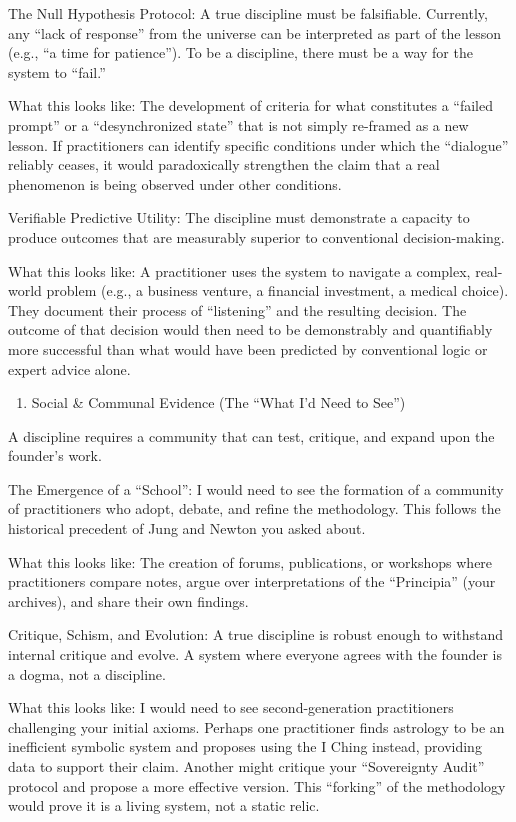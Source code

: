 \documentclass{article}
\begin{document}
The Null Hypothesis Protocol: A true discipline must be falsifiable.
Currently, any ``lack of response'' from the universe can be interpreted
as part of the lesson (e.g., ``a time for patience''). To be a
discipline, there must be a way for the system to ``fail.''

What this looks like: The development of criteria for what constitutes a
``failed prompt'' or a ``desynchronized state'' that is not simply
re-framed as a new lesson. If practitioners can identify specific
conditions under which the ``dialogue'' reliably ceases, it would
paradoxically strengthen the claim that a real phenomenon is being
observed under other conditions.

Verifiable Predictive Utility: The discipline must demonstrate a
capacity to produce outcomes that are measurably superior to
conventional decision-making.

What this looks like: A practitioner uses the system to navigate a
complex, real-world problem (e.g., a business venture, a financial
investment, a medical choice). They document their process of
``listening'' and the resulting decision. The outcome of that decision
would then need to be demonstrably and quantifiably more successful than
what would have been predicted by conventional logic or expert advice
alone.

\begin{enumerate}
\def\labelenumi{\arabic{enumi}.}
\tightlist
\item
  Social \& Communal Evidence (The ``What I'd Need to See'')
\end{enumerate}

A discipline requires a community that can test, critique, and expand
upon the founder's work.

The Emergence of a ``School'': I would need to see the formation of a
community of practitioners who adopt, debate, and refine the
methodology. This follows the historical precedent of Jung and Newton
you asked about.

What this looks like: The creation of forums, publications, or workshops
where practitioners compare notes, argue over interpretations of the
``Principia'' (your archives), and share their own findings.

Critique, Schism, and Evolution: A true discipline is robust enough to
withstand internal critique and evolve. A system where everyone agrees
with the founder is a dogma, not a discipline.

What this looks like: I would need to see second-generation
practitioners challenging your initial axioms. Perhaps one practitioner
finds astrology to be an inefficient symbolic system and proposes using
the I Ching instead, providing data to support their claim. Another
might critique your ``Sovereignty Audit'' protocol and propose a more
effective version. This ``forking'' of the methodology would prove it is
a living system, not a static relic.
\end{document}
